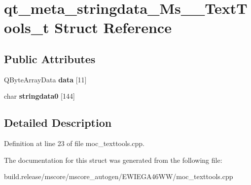 \hypertarget{structqt__meta__stringdata___ms_____text_tools__t}{}\section{qt\+\_\+meta\+\_\+stringdata\+\_\+\+Ms\+\_\+\+\_\+\+Text\+Tools\+\_\+t Struct Reference}
\label{structqt__meta__stringdata___ms_____text_tools__t}
\subsection*{Public Attributes}
\begin{DoxyCompactItemize}
\item 
\mbox{\label{structqt__meta__stringdata___ms_____text_tools__t_ab1d6a63dd8e21326ae3cbc6262068ab0}} 
Q\+Byte\+Array\+Data {\bfseries data} \mbox{[}11\mbox{]}
\item 
\mbox{\label{structqt__meta__stringdata___ms_____text_tools__t_a9e1ce0a3e5548b00c029f3ba8a3c64dc}} 
char {\bfseries stringdata0} \mbox{[}144\mbox{]}
\end{DoxyCompactItemize}


\subsection{Detailed Description}


Definition at line 23 of file moc\+\_\+texttools.\+cpp.



The documentation for this struct was generated from the following file\+:\begin{DoxyCompactItemize}
\item 
build.\+release/mscore/mscore\+\_\+autogen/\+E\+W\+I\+E\+G\+A46\+W\+W/moc\+\_\+texttools.\+cpp\end{DoxyCompactItemize}
